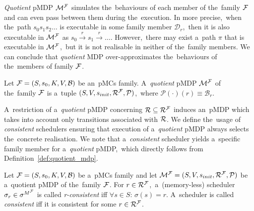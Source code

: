 \textit{Quotient} pMDP $\mathcal{M}^{\mathcal{F}}$ simulates the~behaviours of each member of the~family $\mathcal{F}$ and can even pass between them during the~execution.
In more precise,~when the~path $s_0s_1s_2 \dots$ is executable in some family member $\mathcal{D}_r$,~then it is also executable in $\mathcal{M}^{\mathcal{F}}$ as $s_0 \overset{r}{\rightarrow} s_1 \overset{r}{\rightarrow} \dots$.
However,~there may exist a~path $\pi$ that is executable in $\mathcal{M}^{\mathcal{F}}$,~but it is not realisable in neither of the~family members.
We can conclude that \textit{quotient} MDP over-approximates the~behaviours of the~members of family $\mathcal{F}$.

\begin{definition} \label{def:quotient_mdp}
\cite{roman-DP}
Let $\mathcal{F} = (S,s_{0},K, V, \mathcal{B})$ be an~pMCs family.
A~\textit{quotient} pMDP $\mathcal{M}^{\mathcal{F}}$ of the~family $\mathcal{F}$ is a~tuple $(S, V, s_{init}, \mathcal{R}^{\mathcal{F}}, \mathcal{P})$,~where $\mathcal{P}(\cdot)(r) \equiv \mathcal{B}_r$.
\end{definition}

A~restriction of a~\textit{quotient} pMDP concerning $\mathcal{R} \subseteq \mathcal{R}^{\mathcal{F}}$ induces an~pMDP which takes into account only transitions associated with $\mathcal{R}$.
We define the~usage of \textit{consistent} schedulers ensuring that execution of a~\textit{quotient} pMDP always selects the~concrete realisation.
We note that a~\textit{consistent} scheduler yields a~specific family member for a~\textit{quotient} pMDP,~which directly follows from Definition~\ref{def:quotient_mdp}.

\begin{definition}
\cite{roman-DP}
Let $\mathcal{F} = (S,s_{0},K, V, \mathcal{B})$ be a~pMCs family and let $\mathcal{M}^{\mathcal{F}} = (S, V, s_{init}, \mathcal{R}^{\mathcal{F}}, \mathcal{P})$ be a~quotient pMDP of the~family $\mathcal{F}$.
For $r \in \mathcal{R}^{\mathcal{F}}$,~a~(memory-less) scheduler $\sigma_r \in \sigma^{M^{\mathcal{F}}}$ is called \textit{r-consistent} iff $\forall s \in S: \, \sigma(s) = r$.
A~scheduler is called \textit{consistent} iff it is consistent for some $r \in \mathcal{R}^{\mathcal{F}}$.
\end{definition}
